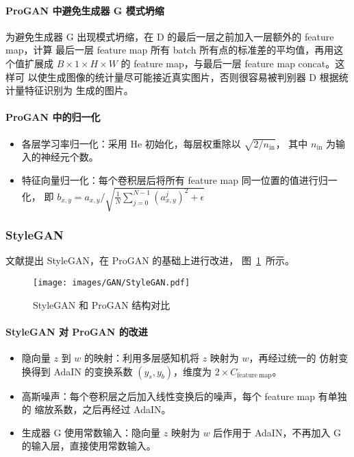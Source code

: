 \paragraph{ProGAN 中避免生成器 G 模式坍缩}
为避免生成器 G 出现模式坍缩，在 D 的最后一层之前加入一层额外的 feature map，计算
最后一层 feature map 所有 batch 所有点的标准差的平均值，再用这个值扩展成 $B
\times 1 \times H \times W$ 的 feature map，与最后一层 feature map concat。这样可
以使生成图像的统计量尽可能接近真实图片，否则很容易被判别器 D 根据统计量特征识别为
生成的图片。

\paragraph{ProGAN 中的归一化}
\begin{itemize}
  \item 各层学习率归一化：采用 He 初始化，每层权重除以 $\sqrt{2/n_{\mathrm{in}}}$，
    其中 $n_{\mathrm{in}}$ 为输入的神经元个数。
  \item 特征向量归一化：每个卷积层后将所有 feature map 同一位置的值进行归一化，
    即 $b_{x, y} = a_{x, y}/\sqrt{\frac{1}{N} \sum_{j=0}^{N-1} {\left( a_{x,
          y}^{j} \right)} ^ 2 + \epsilon }$
\end{itemize}

\subsubsection{StyleGAN}
文献提出 StyleGAN，在 ProGAN 的基础上进行改进，
图~\ref{fig:stylegan}~所示。

\begin{figure}[ht]
  \centering
  \texttt{[image: images/GAN/StyleGAN.pdf]}
  \caption{StyleGAN 和 ProGAN 结构对比}\label{fig:stylegan}
\end{figure}

\paragraph{StyleGAN 对 ProGAN 的改进}
\begin{itemize}
  \item 隐向量 $z$ 到 $w$ 的映射：利用多层感知机将 $z$ 映射为 $w$，再经过统一的
    仿射变换得到 AdaIN 的变换系数 $(y_s, y_b)$，维度为 $2 \times
    C_{\mathrm{feature\ map}}$。
  \item 高斯噪声：每个卷积层之后加入线性变换后的噪声，每个 feature map 有单独的
    缩放系数，之后再经过 AdaIN。
  \item 生成器 G 使用常数输入：隐向量 $z$ 映射为 $w$ 后作用于 AdaIN，不再加入 G
    的输入层，直接使用常数输入。
\end{itemize}

